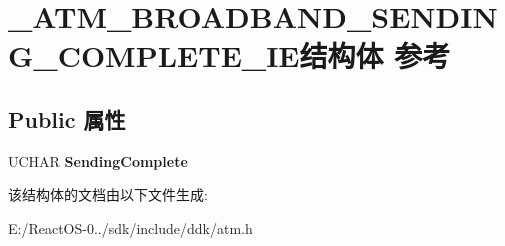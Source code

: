\hypertarget{struct___a_t_m___b_r_o_a_d_b_a_n_d___s_e_n_d_i_n_g___c_o_m_p_l_e_t_e___i_e}{}\section{\+\_\+\+A\+T\+M\+\_\+\+B\+R\+O\+A\+D\+B\+A\+N\+D\+\_\+\+S\+E\+N\+D\+I\+N\+G\+\_\+\+C\+O\+M\+P\+L\+E\+T\+E\+\_\+\+I\+E结构体 参考}
\label{struct___a_t_m___b_r_o_a_d_b_a_n_d___s_e_n_d_i_n_g___c_o_m_p_l_e_t_e___i_e}
\subsection*{Public 属性}
\begin{DoxyCompactItemize}
\item 
\mbox{\label{struct___a_t_m___b_r_o_a_d_b_a_n_d___s_e_n_d_i_n_g___c_o_m_p_l_e_t_e___i_e_acac5647bc69a00ca712911a494c18cc7}} 
U\+C\+H\+AR {\bfseries Sending\+Complete}
\end{DoxyCompactItemize}


该结构体的文档由以下文件生成\+:\begin{DoxyCompactItemize}
\item 
E\+:/\+React\+O\+S-\/0../sdk/include/ddk/atm.\+h\end{DoxyCompactItemize}
